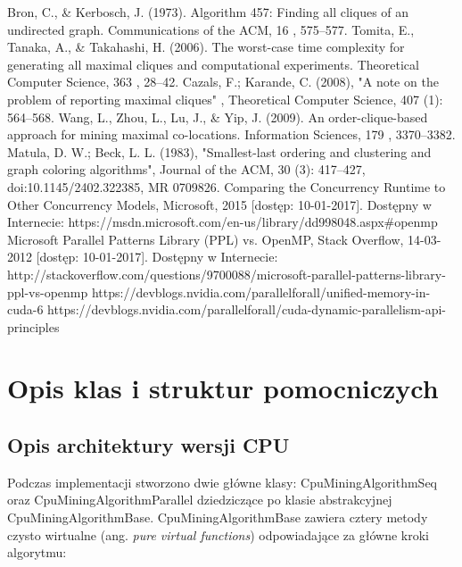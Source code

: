 \documentclass[12pt]{article}
\newcounter{algorytm}
\begin{document}
\begin{thebibliography}{}
Bron, C., \& Kerbosch, J. (1973). Algorithm 457: Finding all cliques of an undirected graph. Communications of the ACM, 16 , 575–577.
Tomita, E., Tanaka, A., \& Takahashi, H. (2006). The worst-case time complexity for
generating all maximal cliques and computational experiments. Theoretical Computer Science, 363 , 28–42.
Cazals, F.; Karande, C. (2008), "A note on the problem of reporting maximal cliques" , Theoretical Computer Science, 407 (1): 564–568.
Wang, L., Zhou, L., Lu, J., \& Yip, J. (2009). An order-clique-based approach for mining maximal co-locations. Information Sciences, 179 , 3370–3382.
Matula, D. W.; Beck, L. L. (1983), "Smallest-last ordering and clustering and graph coloring algorithms", Journal of the ACM, 30 (3): 417–427, doi:10.1145/2402.322385, MR 0709826.
Comparing the Concurrency Runtime to Other Concurrency Models, Microsoft, 2015 [dostęp: 10-01-2017]. Dostępny w Internecie: https://msdn.microsoft.com/en-us/library/dd998048.aspx\#openmp
Microsoft Parallel Patterns Library (PPL) vs. OpenMP, Stack Overflow, 14-03-2012 [dostęp: 10-01-2017]. Dostępny w Internecie: http://stackoverflow.com/questions/9700088/microsoft-parallel-patterns-library-ppl-vs-openmp
https://devblogs.nvidia.com/parallelforall/unified-memory-in-cuda-6
https://devblogs.nvidia.com/parallelforall/cuda-dynamic-parallelism-api-principles

\end{thebibliography}
\newpage

\appendix

\section{Opis klas i struktur pomocniczych}
\label{sec:wypociny}

\subsection{Opis architektury wersji CPU}

Podczas implementacji stworzono dwie główne klasy: CpuMiningAlgorithmSeq oraz CpuMiningAlgorithmParallel dziedziczące po klasie abstrakcyjnej CpuMiningAlgorithmBase. CpuMiningAlgorithmBase zawiera cztery metody czysto wirtualne (ang. \textit{pure virtual functions}) odpowiadające za główne kroki algorytmu:
\end{document}
